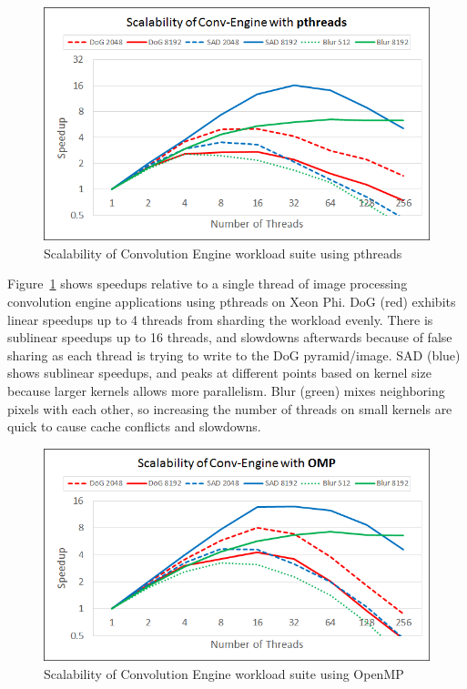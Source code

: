 \begin{figure}
  \begin{center}
    \includegraphics[width=\linewidth]{cs758-figs/scalability-convEngine-pthread.png}
  \end{center}
\vspace{-0.2in}
  \caption{Scalability of Convolution Engine workload suite using pthreads}
  \label{fig:scalability-convEngine-pthread}
\vspace{-0.05in}
\end{figure}

Figure~\ref{fig:scalability-convEngine-pthread} shows speedups relative to a 
single thread of image processing convolution engine applications using pthreads 
on Xeon Phi. DoG (red) exhibits linear speedups up to 4 threads from sharding 
the workload evenly. There is sublinear speedups up to 16 threads, and slowdowns 
afterwards because of false sharing as each thread is trying to write to the DoG 
pyramid/image. SAD (blue) shows sublinear speedups, and peaks at different 
points based on kernel size because larger kernels allows more parallelism. Blur 
(green) mixes neighboring pixels with each other, so increasing the number of 
threads on small kernels are quick to cause cache conflicts and slowdowns. 


\begin{figure}
  \begin{center}
    \includegraphics[width=\linewidth]{cs758-figs/scalability-convEngine-omp.png}
  \end{center}
\vspace{-0.2in}
  \caption{Scalability of Convolution Engine workload suite using OpenMP}
  \label{fig:scalability-convEngine-omp}
\vspace{-0.05in}
\end{figure}

